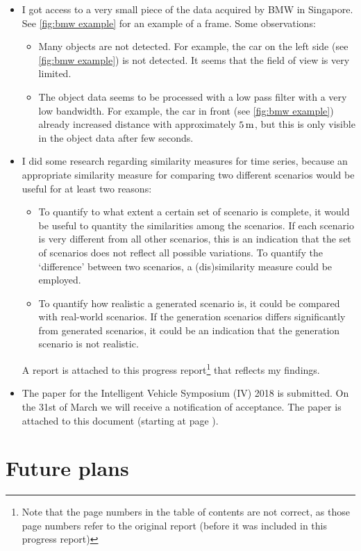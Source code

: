 \documentclass[10pt,final,a4paper,oneside,onecolumn]{article}
\begin{document}
\begin{itemize}
	\item I got access to a very small piece of the data acquired by BMW in Singapore. See \cref{fig:bmw example} for an example of a frame. Some observations:
	\begin{itemize}
		\item Many objects are not detected. For example, the car on the left side (see \cref{fig:bmw example}) is not detected. It seems that the field of view is very limited.
		\item The object data seems to be processed with a low pass filter with a very low bandwidth. For example, the car in front (see \cref{fig:bmw example}) already increased distance with approximately $\unit[5]{m}$, but this is only visible in the object data after few seconds.
	\end{itemize}
	\item I did some research regarding similarity measures for time series, because an appropriate similarity measure for comparing two different scenarios would be useful for at least two reasons:
	\begin{itemize}
		\item To quantify to what extent a certain set of scenario is complete, it would be useful to quantity the similarities among the scenarios. If each scenario is very different from all other scenarios, this is an indication that the set of scenarios does not reflect all possible variations. To quantify the `difference' between two scenarios, a (dis)similarity measure could be employed.
		\item To quantify how realistic a generated scenario is, it could be compared with real-world scenarios. If the generation scenarios differs significantly from generated scenarios, it could be an indication that the generation scenario is not realistic.
	\end{itemize}
	A report is attached to this progress report\footnote{Note that the page numbers in the table of contents are not correct, as those page numbers refer to the original report (before it was included in this progress report)} that reflects my findings.
	\item The paper for the Intelligent Vehicle Symposium (IV) 2018 is submitted. On the 31st of March we will receive a notification of acceptance. The paper is attached to this document (starting at page \pageref{ivpaper}).
\end{itemize}

\section{Future plans}
\end{document}
